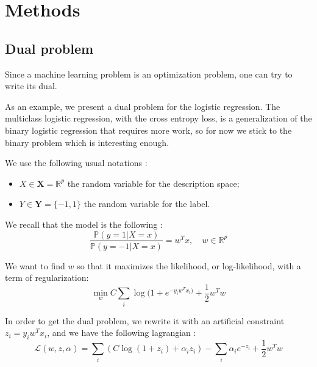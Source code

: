 \documentclass{article}
\begin{document}
\newpage
\section{Methods}

\subsection{Dual problem}

Since a machine learning problem is an optimization problem, one can try to write its dual.

As an example, we present a dual problem for the logistic regression.
The multiclass logistic regression, with the cross entropy loss, is a generalization of the binary logistic regression that requires more work, so for now we stick to the binary problem which is interesting enough.

We use the following usual notations :
\begin{itemize}
	\item[] $X \in \mathbf{X} = \mathbb{R}^p$ the random variable for the description space;
	\item[] $Y \in \mathbf{Y} = \{-1,1\}$ the random variable for the label.
\end{itemize}

We recall that the model is the following :
\begin{equation}
	\frac{\mathbb{P}(y=1 | X=x)}{\mathbb{P}(y=-1 |X=x)} = w^T x, \quad w \in \mathbb{R}^p
\end{equation}

We want to find $w$ so that it maximizes the likelihood, or log-likelihood, with a term of regularization:
\begin{equation}
	\min_w C \sum_i \log(1 + e^{-y_iw^Tx_i)}  + \frac{1}{2} w^Tw
\end{equation}

In order to get the dual problem, we rewrite it with an artificial constraint $z_i = y_iw^Tx_i$, and we have the following lagrangian :
\begin{equation}
	\mathcal{L}(w, z, \alpha) = \sum_i (C \log(1+z_i) + \alpha_i z_i) - \sum_i \alpha_i e^{-z_i} + \frac{1}{2}w^Tw 
\end{equation}
\end{document}

